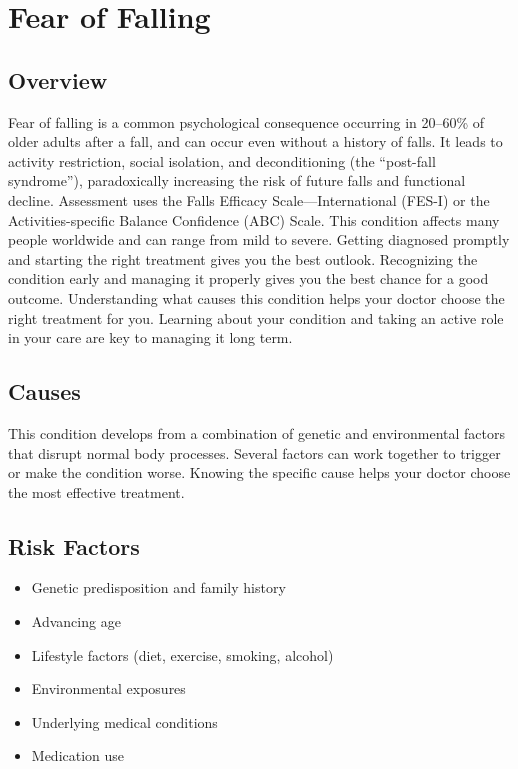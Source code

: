 \chapter{Fear of Falling}
\label{sec:Fear of Falling}

\section{Overview}
Fear of falling is a common psychological consequence occurring in 20--60\% of older adults after a fall, and can occur even without a history of falls. It leads to activity restriction, social isolation, and deconditioning (the ``post-fall syndrome''), paradoxically increasing the risk of future falls and functional decline. Assessment uses the Falls Efficacy Scale---International (FES-I) or the Activities-specific Balance Confidence (ABC) Scale. This condition affects many people worldwide and can range from mild to severe. Getting diagnosed promptly and starting the right treatment gives you the best outlook. Recognizing the condition early and managing it properly gives you the best chance for a good outcome. Understanding what causes this condition helps your doctor choose the right treatment for you. Learning about your condition and taking an active role in your care are key to managing it long term.

\section{Causes}
This condition develops from a combination of genetic and environmental factors that disrupt normal body processes. Several factors can work together to trigger or make the condition worse. Knowing the specific cause helps your doctor choose the most effective treatment.

\section{Risk Factors}

\begin{itemize}[noitemsep]
  \item Genetic predisposition and family history
  \item Advancing age
  \item Lifestyle factors (diet, exercise, smoking, alcohol)
  \item Environmental exposures
  \item Underlying medical conditions
  \item Medication use
\end{itemize}

